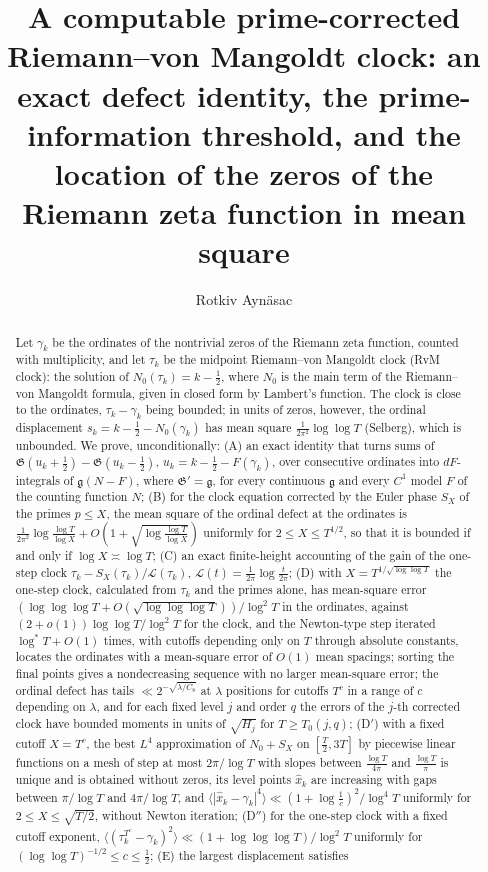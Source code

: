 \documentclass[preprint,12pt]{elsarticle}
\numberwithin{equation}{section}
\theoremstyle{plain}
\theoremstyle{definition}
\theoremstyle{remark}
\newcommand{\NO}{N_0}
\newcommand{\lL}{\mathcal L}
\begin{document}
\begin{frontmatter}
\title{A computable prime-corrected Riemann--von Mangoldt clock: an exact defect identity, the prime-information threshold, and the location of the zeros of the Riemann zeta function in mean square}
\author{Rotkiv Ayn\"asac}

\begin{abstract}
Let $\gamma_k$ be the ordinates of the nontrivial zeros of the Riemann zeta function, counted with multiplicity, and let $\tau_k$ be the midpoint Riemann--von Mangoldt clock (RvM clock): the solution of $\NO(\tau_k)=k-\frac12$, where $\NO$ is the main term of the Riemann--von Mangoldt formula, given in closed form by Lambert's function. The clock is close to the ordinates, $\tau_k-\gamma_k$ being bounded; in units of zeros, however, the ordinal displacement $s_k=k-\frac12-\NO(\gamma_k)$ has mean square $\frac1{2\pi^2}\log\log T$ (Selberg), which is unbounded. We prove, unconditionally: (A) an exact identity that turns sums of $\mathfrak G(u_k+\frac12)-\mathfrak G(u_k-\frac12)$, $u_k=k-\frac12-F(\gamma_k)$, over consecutive ordinates into $dF$-integrals of $\mathfrak g(N-F)$, where $\mathfrak G'=\mathfrak g$, for every continuous $\mathfrak g$ and every $C^1$ model $F$ of the counting function $N$; (B) for the clock equation corrected by the Euler phase $S_X$ of the primes $p\le X$, the mean square of the ordinal defect at the ordinates is $\frac1{2\pi^2}\log\frac{\log T}{\log X}+O(1+\sqrt{\log\frac{\log T}{\log X}})$ uniformly for $2\le X\le T^{1/2}$, so that it is bounded if and only if $\log X\asymp\log T$; (C) an exact finite-height accounting of the gain of the one-step clock $\tau_k-S_X(\tau_k)/\lL(\tau_k)$, $\lL(t)=\frac1{2\pi}\log\frac t{2\pi}$; (D) with $X=T^{1/\sqrt{\log\log T}}$ the one-step clock, calculated from $\tau_k$ and the primes alone, has mean-square error $(\log\log\log T+O(\sqrt{\log\log\log T}))/\log^2T$ in the ordinates, against $(2+o(1))\log\log T/\log^2T$ for the clock, and the Newton-type step iterated $\log^*T+O(1)$ times, with cutoffs depending only on $T$ through absolute constants, locates the ordinates with a mean-square error of $O(1)$ mean spacings; sorting the final points gives a nondecreasing sequence with no larger mean-square error; the ordinal defect has tails $\ll2^{-\sqrt{\lambda/C_8}}$ at $\lambda$ positions for cutoffs $T^c$ in a range of $c$ depending on $\lambda$, and for each fixed level $j$ and order $q$ the errors of the $j$-th corrected clock have bounded moments in units of $\sqrt{H_j}$ for $T\ge T_0(j,q)$; (D$'$) with a fixed cutoff $X=T^c$, the best $L^4$ approximation of $\NO+S_X$ on $[\frac T2,3T]$ by piecewise linear functions on a mesh of step at most $2\pi/\log T$ with slopes between $\frac{\log T}{4\pi}$ and $\frac{\log T}\pi$ is unique and is obtained without zeros, its level points $\widehat x_k$ are increasing with gaps between $\pi/\log T$ and $4\pi/\log T$, and $\langle|\widehat x_k-\gamma_k|^4\rangle\ll(1+\log\frac1c)^2/\log^4T$ uniformly for $2\le X\le\sqrt{T/2}$, without Newton iteration; (D$''$) for the one-step clock with a fixed cutoff exponent, $\langle(\tau_k^{T^c}-\gamma_k)^2\rangle\ll(1+\log\log\log T)/\log^2T$ uniformly for $(\log\log T)^{-1/2}\le c\le\frac12$; (E) the largest displacement satisfies 
\end{abstract}
\end{frontmatter}
\end{document}

